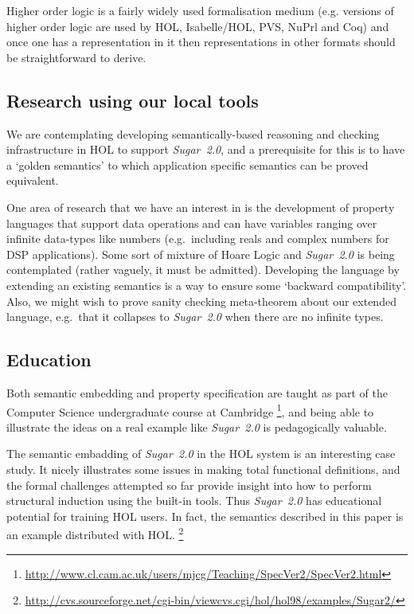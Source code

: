 \documentclass{llncs}
\newcommand\Sugar{{\it{Sugar~2.0}}\xspace}
\newcommand\Hol{HOL\xspace}
\newcommand\HOL{\Hol}
\begin{document}
Higher order logic is a fairly widely used formalisation medium
(e.g. versions of higher order logic are used by \Hol,
Isabelle/HOL, PVS, NuPrl and Coq) and once one has a representation
in it then representations in other formats should be straightforward
to derive.

\vspace*{-3mm}

\subsection{Research using our local tools}


We are contemplating developing semantically-based reasoning and
checking infrastructure in \HOL to support \Sugar, and a prerequisite
for this is to have a `golden semantics' to which application specific
semantics can be proved equivalent.

One area of research that we have an interest in is the development of property
languages that support data operations and can have variables
ranging over infinite data-types like numbers
(e.g.~including reals and complex numbers for DSP applications). Some
sort of mixture of Hoare Logic and \Sugar is being contemplated
(rather vaguely, it must be admitted).  Developing the language by
extending an existing semantics is a way to ensure some `backward
compatibility'.  Also, we might wish to prove sanity checking
meta-theorem about our extended language, e.g.~that it collapses to
\Sugar when there are no infinite types.

\vspace*{-3mm}

\subsection{Education}

Both semantic embedding and property specification are taught as part
of the Computer Science undergraduate course at
Cambridge%
\footnote{\url{http://www.cl.cam.ac.uk/users/mjcg/Teaching/SpecVer2/SpecVer2.html}},
and being able to illustrate the ideas on a real example like \Sugar
is pedagogically valuable.

The semantic embadding of \Sugar in the \Hol system is an interesting case
study. It nicely illustrates some issues in making total functional
definitions, and the formal challenges attempted so far provide
insight into how to perform structural induction using the built-in
tools.  Thus \Sugar has educational potential for training \Hol
users. In fact, the semantics described in this paper is an
example distributed with \Hol.%
\footnote%
{\url{http://cvs.sourceforge.net/cgi-bin/viewcvs.cgi/hol/hol98/examples/Sugar2/}}
\end{document}
